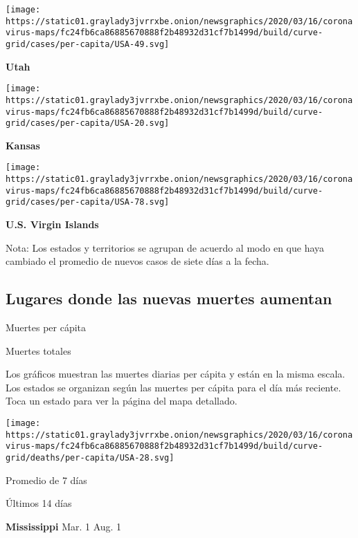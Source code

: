\href{https://www.nytimes3xbfgragh.onion/interactive/2020/us/utah-coronavirus-cases.html}{}

\texttt{[image: https://static01.graylady3jvrrxbe.onion/newsgraphics/2020/03/16/coronavirus-maps/fc24fb6ca86885670888f2b48932d31cf7b1499d/build/curve-grid/cases/per-capita/USA-49.svg]}

\textbf{Utah}

\href{https://www.nytimes3xbfgragh.onion/interactive/2020/us/kansas-coronavirus-cases.html}{}

\texttt{[image: https://static01.graylady3jvrrxbe.onion/newsgraphics/2020/03/16/coronavirus-maps/fc24fb6ca86885670888f2b48932d31cf7b1499d/build/curve-grid/cases/per-capita/USA-20.svg]}

\textbf{Kansas}

\texttt{[image: https://static01.graylady3jvrrxbe.onion/newsgraphics/2020/03/16/coronavirus-maps/fc24fb6ca86885670888f2b48932d31cf7b1499d/build/curve-grid/cases/per-capita/USA-78.svg]}

\textbf{U.S. Virgin Islands}

Nota: Los estados y territorios se agrupan de acuerdo al modo en que
haya cambiado el promedio de nuevos casos de siete días a la fecha.

\hypertarget{lugares-donde-las-nuevas-muertes-aumentan}{%
\subsection{Lugares donde las nuevas muertes
aumentan}\label{lugares-donde-las-nuevas-muertes-aumentan}}

Muertes per cápita

Muertes totales

Los gráficos muestran las muertes diarias per cápita y están en la misma
escala. Los estados se organizan según las muertes per cápita para el
día más reciente. Toca un estado para ver la página del mapa detallado.

\href{https://www.nytimes3xbfgragh.onion/interactive/2020/us/mississippi-coronavirus-cases.html}{}

\texttt{[image: https://static01.graylady3jvrrxbe.onion/newsgraphics/2020/03/16/coronavirus-maps/fc24fb6ca86885670888f2b48932d31cf7b1499d/build/curve-grid/deaths/per-capita/USA-28.svg]}

Promedio de 7 días

Últimos 14 días

\textbf{Mississippi} Mar. 1 Aug. 1

